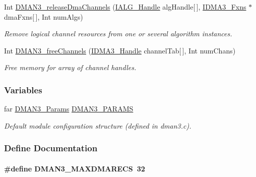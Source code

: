 \begin{CompactItemize}
Int \hyperlink{group___d_s_p_d_m_a_n3_g664b5e2445c2ec3a0ed9e14f8cfc1d20}{DMAN3\_\-release\-Dma\-Channels} (\hyperlink{struct_i_a_l_g___obj}{IALG\_\-Handle} alg\-Handle\mbox{[}$\,$\mbox{]}, \hyperlink{struct_i_d_m_a3___fxns}{IDMA3\_\-Fxns} $\ast$dma\-Fxns\mbox{[}$\,$\mbox{]}, Int num\-Algs)
\begin{CompactList}\small\item\em Remove logical channel resources from one or several algorithm instances. \item\end{CompactList}\item 
Int \hyperlink{group___d_s_p_d_m_a_n3_g2d14c4952c1194b913ac6e8bb7f0e9d5}{DMAN3\_\-free\-Channels} (\hyperlink{struct_i_d_m_a3___obj}{IDMA3\_\-Handle} channel\-Tab\mbox{[}$\,$\mbox{]}, Int num\-Chans)
\begin{CompactList}\small\item\em Free memory for array of channel handles. \item\end{CompactList}\end{CompactItemize}
\subsubsection*{Variables}
\begin{CompactItemize}
\item 
far \hyperlink{struct_d_m_a_n3___params}{DMAN3\_\-Params} \hyperlink{group___d_s_p_d_m_a_n3_g553609efedb936222e4492f0ffa3d1cc}{DMAN3\_\-PARAMS}
\begin{CompactList}\small\item\em Default module configuration structure (defined in dman3.c). \item\end{CompactList}\end{CompactItemize}


\subsubsection{Define Documentation}
\hypertarget{group___d_s_p_d_m_a_n3_gc5bb90e4340386e641863309330e4fb5}{
\paragraph[DMAN3\_\-MAXDMARECS]{\setlength{\rightskip}{0pt plus 5cm}\#define DMAN3\_\-MAXDMARECS~32}\hfill}
\label{group___d_s_p_d_m_a_n3_gc5bb90e4340386e641863309330e4fb5}


